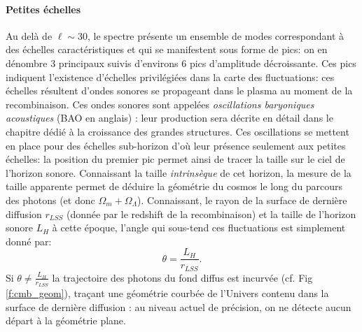 \paragraph{Petites échelles} Au delà de $\ell\sim 30$, le spectre présente un ensemble de modes correspondant à des échelles caractéristiques et qui se manifestent sous forme de pics: on en dénombre 3 principaux suivis d'environs 6 pics d'amplitude décroissante. Ces pics indiquent l'existence d'échelles privilégiées dans la carte des fluctuations: ces échelles résultent d'ondes sonores se propageant dans le plasma au moment de la recombinaison. Ces ondes sonores sont appelées \textit{oscillations baryoniques acoustiques} (BAO en anglais) : leur production sera décrite en détail dans le chapitre dédié à la croissance des grandes structures. Ces oscillations se mettent en place pour des échelles sub-horizon d'où leur présence seulement aux petites échelles: la position du premier pic permet ainsi de tracer la taille sur le ciel de l'horizon sonore. Connaissant la taille \textit{intrinsèque} de cet horizon, la mesure de la taille apparente permet de déduire la géométrie du cosmos le long du parcours des photons (et donc $\Omega_m+\Omega_\Lambda$). Connaissant, le rayon de la surface de dernière diffusion $r_{LSS}$ (donnée par le redshift de la recombinaison) et la taille de l'horizon  sonore $L_H$ à cette époque, l'angle qui sous-tend ces fluctuations est simplement donné par:
\begin{equation}
\theta=\frac{L_H}{r_{LSS}}.
\end{equation}
Si $\theta \neq \frac{L_H}{r_{LSS}}$ la trajectoire des photons du fond diffus est incurvée (cf. Fig \ref{f:cmb_geom}), traçant une géométrie courbée de l'Univers contenu dans la surface de dernière diffusion : au niveau actuel de précision, on ne détecte aucun départ à la géométrie plane.
